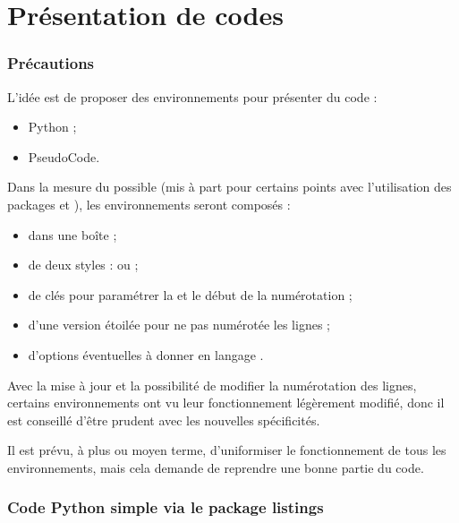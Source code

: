 \part{Présentation de codes}

\section{Précautions}\label{codenumlignes}

\begin{tipblock}
L'idée est de proposer des environnements pour présenter du code :

\begin{itemize}
	\item \textsf{Python} ;
	\item \textsf{PseudoCode}.
\end{itemize}

Dans la mesure du possible (mis à part pour certains points avec l'utilisation des packages  et ), les environnements seront composés :

\begin{itemize}
	\item dans une boîte  ;
	\item de deux styles :  ou  ;
	\item de clés pour paramétrer la  et le début de la numérotation  ;
	\item d'une version étoilée pour ne pas numérotée les lignes ;
	\item d'options éventuelles à donner en langage .
\end{itemize}
\vspace*{-\baselineskip}\leavevmode
\end{tipblock}

\begin{warningblock}
Avec la mise à jour  et la possibilité de modifier la numérotation des lignes, certains environnements ont vu leur fonctionnement légèrement modifié, donc il est conseillé d'être prudent avec les nouvelles spécificités.

\smallskip

Il est prévu, à plus ou moyen terme, d'uniformiser le fonctionnement de tous les environnements, mais cela demande de reprendre une bonne partie du code.
\end{warningblock}

\section{Code Python \og simple \fg{} via le package listings}\label{pythonsimple}

